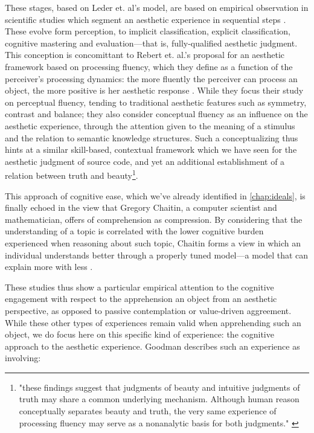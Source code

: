 These stages, based on Leder et. al's model, are based on empirical observation in scientific studies which segment an aesthetic experience in sequential steps \citep{leder_model_2004}. These evolve form perception, to implicit classification, explicit classification, cognitive mastering and evaluation—that is, fully-qualified aesthetic judgment. This conception is concomittant to Rebert et. al.'s proposal for an aesthetic framework based on processing fluency, which they define as a function of the perceiver's processing dynamics: the more fluently the perceiver can process an object, the more positive is her aesthetic response \citep{reber_processing_2004}. While they focus their study on perceptual fluency, tending to traditional aesthetic features such as symmetry, contrast and balance; they also consider conceptual fluency as an influence on the aesthetic experience, through the attention given to the meaning of a stimulus and the relation to semantic knowledge structures. Such a conceptualizing thus hints at a similar skill-based, contextual framework which we have seen for the aesthetic judgment of source code, and yet an additional establishment of a relation between truth and beauty\footnote{"these findings suggest that judgments of beauty and intuitive judgments of truth may share a common underlying mechanism. Although human reason conceptually separates beauty and truth, the very same experience of processing fluency may serve as a nonanalytic basis for both judgments." \citep{reber_processing_2004}}.

This approach of cognitive ease, which we've already identified in \ref{chap:ideals}, is finally echoed in the view that Gregory Chaitin, a computer scientist and mathematician, offers of comprehension as compression. By considering that the understanding of a topic is correlated with the lower cognitive burden experienced when reasoning about such topic, Chaitin forms a view in which an individual understands better through a properly tuned model—a model that can explain more with less \citep{zenil_compression_2021}.

\spacer

These studies thus show a particular empirical attention to the cognitive engagement with respect to the apprehension an object from an aesthetic perspective, as opposed to passive contemplation or value-driven aggreement. While these other types of experiences remain valid when apprehending such an object, we do focus here on this specific kind of experience: the cognitive approach to the aesthetic experience. Goodman describes such an experience as involving:

